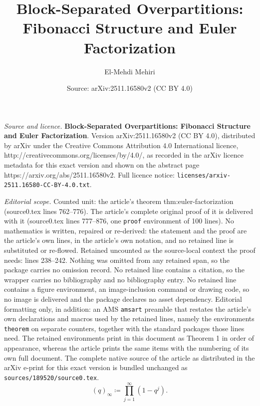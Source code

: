 \documentclass[10pt,a4paper]{amsart}
\title{\textbf{Block-Separated Overpartitions: Fibonacci Structure and Euler Factorization}}
\author{El-Mehdi Mehiri}
\date{Source: arXiv:2511.16580v2 (CC BY 4.0)}
\begin{document}
\maketitle

\noindent\emph{Source and licence.} \textbf{Block-Separated Overpartitions: Fibonacci Structure and Euler Factorization}. Version arXiv:2511.16580v2 (CC BY 4.0), distributed by arXiv under the Creative Commons Attribution 4.0 International licence, http://creativecommons.org/licenses/by/4.0/, as recorded in the arXiv licence metadata for this exact version and shown on the abstract page https://arxiv.org/abs/2511.16580v2. Full licence notice: \texttt{licenses/arxiv-2511.16580-CC-BY-4.0.txt}.\par\smallskip

\noindent\textit{Editorial scope.} Counted unit: the article's theorem thm:euler-factorization (source0.tex lines 762--776). The article's complete original proof of it is delivered with it (source0.tex lines 777--876, one \texttt{proof} environment of 100 lines). No mathematics is written, repaired or re-derived: the statement and the proof are the article's own lines, in the article's own notation, and no retained line is substituted or re-flowed.  Retained uncounted as the source-local context the proof needs: lines 238--242.  Nothing was omitted from any retained span, so the package carries no omission record.  No retained line contains a citation, so the wrapper carries no bibliography and no bibliography entry.  No retained line contains a figure environment, an image-inclusion command or drawing code, so no image is delivered and the package declares no asset dependency.  Editorial formatting only, in addition: an AMS \texttt{amsart} preamble that restates the article's own declarations and macros used by the retained lines, namely the environments \texttt{theorem} on separate counters, together with the standard packages those lines need.  The retained environments print in this document as Theorem 1 in order of appearance, whereas the article prints the same items with the numbering of its own full document.  The complete native source of the article as distributed in the arXiv e-print for this exact version is bundled unchanged as \texttt{sources/189520/source0.tex}.
\begin{equation}\label{eq:qpoch}
(q)_\infty
  \coloneqq
  \prod_{j=1}^{\infty} (1 - q^j).
\end{equation}
\end{document}
